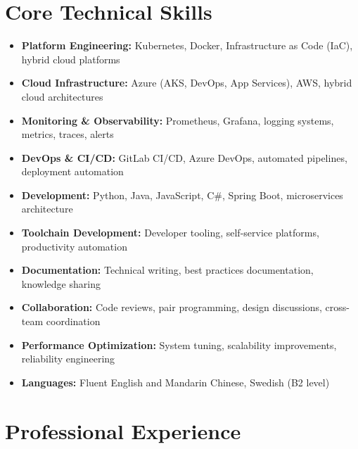 \documentclass[11pt,a4paper]{article}
\begin{document}
\section*{Core Technical Skills}
\begin{itemize}[noitemsep]
\item \textbf{Platform Engineering:} Kubernetes, Docker, Infrastructure as Code (IaC), hybrid cloud platforms
\item \textbf{Cloud Infrastructure:} Azure (AKS, DevOps, App Services), AWS, hybrid cloud architectures
\item \textbf{Monitoring \& Observability:} Prometheus, Grafana, logging systems, metrics, traces, alerts
\item \textbf{DevOps \& CI/CD:} GitLab CI/CD, Azure DevOps, automated pipelines, deployment automation
\item \textbf{Development:} Python, Java, JavaScript, C\#, Spring Boot, microservices architecture
\item \textbf{Toolchain Development:} Developer tooling, self-service platforms, productivity automation
\item \textbf{Documentation:} Technical writing, best practices documentation, knowledge sharing
\item \textbf{Collaboration:} Code reviews, pair programming, design discussions, cross-team coordination
\item \textbf{Performance Optimization:} System tuning, scalability improvements, reliability engineering
\item \textbf{Languages:} Fluent English and Mandarin Chinese, Swedish (B2 level)
\end{itemize}

\section*{Professional Experience}
\end{document}
